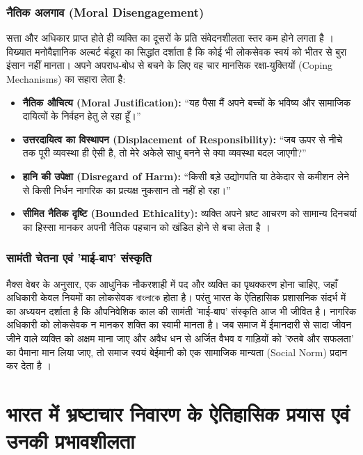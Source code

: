 \documentclass[11pt, a4paper]{article}
\begin{document}
\subsubsection{नैतिक अलगाव (Moral Disengagement)} 
सत्ता और अधिकार प्राप्त होते ही व्यक्ति का दूसरों के प्रति संवेदनशीलता स्तर कम होने लगता है \citep{keltner2003}। विख्यात मनोवैज्ञानिक अल्बर्ट बंडूरा \citep{bandura1999} का सिद्धांत दर्शाता है कि कोई भी लोकसेवक स्वयं को भीतर से बुरा इंसान नहीं मानता। अपने अपराध-बोध से बचने के लिए वह चार मानसिक रक्षा-युक्तियों (Coping Mechanisms) का सहारा लेता है:
\begin{itemize}
    \item \textbf{नैतिक औचित्य (Moral Justification):} ``यह पैसा मैं अपने बच्चों के भविष्य और सामाजिक दायित्वों के निर्वहन हेतु ले रहा हूँ।''
    \item \textbf{उत्तरदायित्व का विस्थापन (Displacement of Responsibility):} ``जब ऊपर से नीचे तक पूरी व्यवस्था ही ऐसी है, तो मेरे अकेले साधु बनने से क्या व्यवस्था बदल जाएगी?''
    \item \textbf{हानि की उपेक्षा (Disregard of Harm):} ``किसी बड़े उद्योगपति या ठेकेदार से कमीशन लेने से किसी निर्धन नागरिक का प्रत्यक्ष नुकसान तो नहीं हो रहा।''
    \item \textbf{सीमित नैतिक दृष्टि (Bounded Ethicality):} व्यक्ति अपने भ्रष्ट आचरण को सामान्य दिनचर्या का हिस्सा मानकर अपनी नैतिक पहचान को खंडित होने से बचा लेता है \citep{chugh2005}।
\end{itemize}

\subsubsection{सामंती चेतना एवं 'माई-बाप' संस्कृति} 
मैक्स वेबर \citep{weber1978} के अनुसार, एक आधुनिक नौकरशाही में पद और व्यक्ति का पृथक्करण होना चाहिए, जहाँ अधिकारी केवल नियमों का लोकसेवक বাংলাকে होता है। परंतु भारत के ऐतिहासिक प्रशासनिक संदर्भ में \citep{wade1982} का अध्ययन दर्शाता है कि औपनिवेशिक काल की सामंती 'माई-बाप' संस्कृति आज भी जीवित है। नागरिक अधिकारी को लोकसेवक न मानकर शक्ति का स्वामी मानता है। जब समाज में ईमानदारी से सादा जीवन जीने वाले व्यक्ति को अक्षम माना जाए और अवैध धन से अर्जित वैभव व गाड़ियों को 'रुतबे और सफलता' का पैमाना मान लिया जाए, तो समाज स्वयं बेईमानी को एक सामाजिक मान्यता (Social Norm) प्रदान कर देता है \citep{bicchieri2017}।

\section{भारत में भ्रष्टाचार निवारण के ऐतिहासिक प्रयास एवं उनकी प्रभावशीलता}
\end{document}
